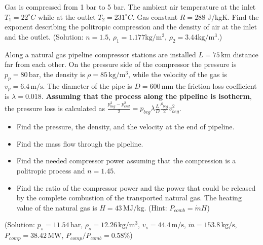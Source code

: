 \vspace{1cm}

Gas is compressed from 1 bar to 5 bar. The ambient air temperature at the inlet $T_1=22^{\circ}C$ while at the outlet $T_2=231^{\circ}C$. Gas constant $R=288$ J/kgK. Find the exponent describing the politropic compression and the density of air at the inlet and the outlet. (Solution: $n=1.5$, $\rho_1=1.177 \mathrm{kg/m^3}$, $\rho_2=3.44 \mathrm{kg/m^3}$.)

\vspace{1cm}

Along a natural gas pipeline compressor stations are installed $L=75\,\mathrm{km}$ distance far from each other. On the pressure side of the compressor the pressure is $p_p=80\,\mathrm{bar}$, the density is $\rho=85\,\mathrm{kg/m^3}$, while the velocity of the gas is $v_p=6.4\,\mathrm{m/s}$. The diameter of the pipe is $D=600\,\mathrm{mm}$ the friction loss coefficient is $\lambda=0.018$. \textbf{Assuming that the process along the pipeline is isotherm}, the pressure loss is calculated as $\frac{p_{beg}^2-p_{end}^2}{2}=p_{beg}\lambda \frac{L}{D}\frac{\rho_{beg}}{2}v_{beg}^2$.

\begin{itemize}
\item Find the pressure, the density, and the velocity at the end of pipeline.
\item Find the mass flow through the pipeline.
\item Find the needed compressor power assuming that the compression is a politropic process and $n=1.45$.
\item Find the ratio of the compressor power and the power that could be released by the complete combustion of the transported natural gas. The heating value of the natural gas is $H=43\,\mathrm{MJ/kg}$. (Hint: $P_{comb}=\dot{m}H$)
\end{itemize}
%
(Solution: $p_s=11.54\,\mathrm{bar}$, $\rho_s=12.26\,\mathrm{kg/m^3}$, $v_s=44.4\,\mathrm{m/s}$, $\dot{m}=153.8\,\mathrm{kg/s}$, $P_{comp}=38.42\,\mathrm{MW}$, $P_{comp}/P_{comb}=0.58\%$)
